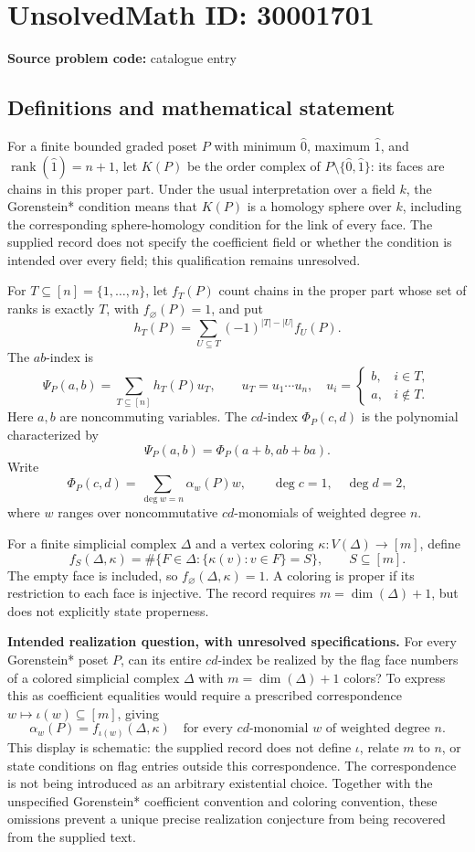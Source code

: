 \documentclass[11pt]{article}
\begin{document}
\section*{UnsolvedMath ID: 30001701}
\textbf{Source problem code:} catalogue entry
\subsection{Definitions and mathematical statement}
For a finite bounded graded poset $P$ with minimum $\hat 0$, maximum $\hat 1$, and $\operatorname{rank}(\hat 1)=n+1$, let $K(P)$ be the order complex of $P\setminus\{\hat 0,\hat 1\}$: its faces are chains in this proper part. Under the usual interpretation over a field $k$, the Gorenstein* condition means that $K(P)$ is a homology sphere over $k$, including the corresponding sphere-homology condition for the link of every face. The supplied record does not specify the coefficient field or whether the condition is intended over every field; this qualification remains unresolved.

For $T\subseteq[n]=\{1,\ldots,n\}$, let $f_T(P)$ count chains in the proper part whose set of ranks is exactly $T$, with $f_{\varnothing}(P)=1$, and put
\[
 h_T(P)=\sum_{U\subseteq T}(-1)^{|T|-|U|}f_U(P).
\]
The $ab$-index is
\[
 \Psi_P(a,b)=\sum_{T\subseteq[n]}h_T(P)u_T,
 \qquad
 u_T=u_1\cdots u_n,\quad
 u_i=\begin{cases}b,&i\in T,\\a,&i\notin T.\end{cases}
\]
Here $a,b$ are noncommuting variables. The $cd$-index $\Phi_P(c,d)$ is the polynomial characterized by
\[
 \Psi_P(a,b)=\Phi_P(a+b,ab+ba).
\]
Write
\[
 \Phi_P(c,d)=\sum_{\deg w=n}\alpha_w(P)w,
 \qquad \deg c=1,\quad\deg d=2,
\]
where $w$ ranges over noncommutative $cd$-monomials of weighted degree $n$.

For a finite simplicial complex $\Delta$ and a vertex coloring $\kappa:V(\Delta)\to[m]$, define
\[
 f_S(\Delta,\kappa)=\#\{F\in\Delta:\{\kappa(v):v\in F\}=S\},
 \qquad S\subseteq[m].
\]
The empty face is included, so $f_{\varnothing}(\Delta,\kappa)=1$. A coloring is proper if its restriction to each face is injective. The record requires $m=\dim(\Delta)+1$, but does not explicitly state properness.

\textbf{Intended realization question, with unresolved specifications.} For every Gorenstein* poset $P$, can its entire $cd$-index be realized by the flag face numbers of a colored simplicial complex $\Delta$ with $m=\dim(\Delta)+1$ colors? To express this as coefficient equalities would require a prescribed correspondence $w\mapsto\iota(w)\subseteq[m]$, giving
\[
 \alpha_w(P)=f_{\iota(w)}(\Delta,\kappa)
 \quad\text{for every }cd\text{-monomial }w\text{ of weighted degree }n.
\]
This display is schematic: the supplied record does not define $\iota$, relate $m$ to $n$, or state conditions on flag entries outside this correspondence. The correspondence is not being introduced as an arbitrary existential choice. Together with the unspecified Gorenstein* coefficient convention and coloring convention, these omissions prevent a unique precise realization conjecture from being recovered from the supplied text.
\end{document}
